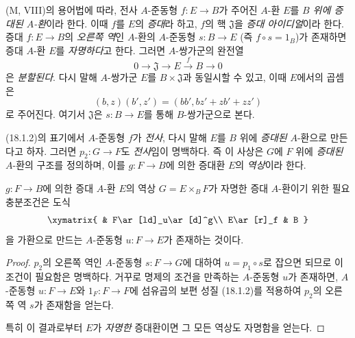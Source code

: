\begin{env}[18.1.4]
\label{0.18.1.4-fr}
(M, VIII)의 용어법에 따라, 전사 $A$-준동형 $f:E\to B$가 주어진
$A$-환 $E$를 \emph{$B$ 위에 증대된 $A$-환}이라 한다. 이때 $f$를
$E$의 \emph{증대}라 하고, $f$의 핵 $\mathfrak{J}$을
\emph{증대 아이디얼}이라 한다. 증대 $f:E\to B$의 \emph{오른쪽 역}인
$A$-환의 $A$-준동형 $s:B\to E$ (즉 $f\circ s=1_B$)가 존재하면
증대 $A$-환 $E$를 \emph{자명하다}고 한다. 그러면 $A$-쌍가군의 완전열
\[
  0\longrightarrow\mathfrak{J}\longrightarrow E
  \xrightarrow{f}B\longrightarrow0
\]
은 \emph{분할된다}. 다시 말해 $A$-쌍가군 $E$를
$B\times\mathfrak{J}$과 동일시할 수 있고, 이때 $E$에서의 곱셈은
\[
  (b,z)(b',z')=(bb',bz'+zb'+zz')
\]
로 주어진다. 여기서 $\mathfrak{J}$은 $s:B\to E$를 통해
$B$-쌍가군으로 본다.
\end{env}

\begin{env}[18.1.5]
\label{0.18.1.5-fr}
(18.1.2)의 표기에서 $A$-준동형 $f$가 \emph{전사}, 다시 말해
$E$를 $B$ 위에 \emph{증대된} $A$-환으로 만든다고 하자. 그러면
$p_2:G\to F$도 \emph{전사}임이 명백하다. 즉 이 사상은 $G$에
$F$ 위에 \emph{증대된} $A$-환의 구조를 정의하며, 이를
$g:F\to B$에 의한 증대환 $E$의 \emph{역상}이라 한다.
\end{env}

\begin{proposition}[18.1.6]
\label{0.18.1.6-fr}
$g:F\to B$에 의한 증대 $A$-환 $E$의 역상
$G=E\times_BF$가 자명한 증대 $A$-환이기 위한 필요충분조건은 도식
\[
  \xymatrix{
    & F\ar[ld]_u\ar[d]^g\\
    E\ar[r]_f & B
  }
\]
을 가환으로 만드는 $A$-준동형 $u:F\to E$가 존재하는 것이다.
\end{proposition}

\begin{proof}
$p_2$의 오른쪽 역인 $A$-준동형 $s:F\to G$에 대하여
$u=p_1\circ s$로 잡으면 되므로 이 조건이 필요함은 명백하다.
거꾸로 명제의 조건을 만족하는 $A$-준동형 $u$가 존재하면,
$A$-준동형 $u:F\to E$와 $1_F:F\to F$에 섬유곱의 보편 성질
(18.1.2)를 적용하여 $p_2$의 오른쪽 역 $s$가 존재함을 얻는다.

특히 이 결과로부터 $E$가 \emph{자명한} 증대환이면 그 모든 역상도
자명함을 얻는다.
\end{proof}

